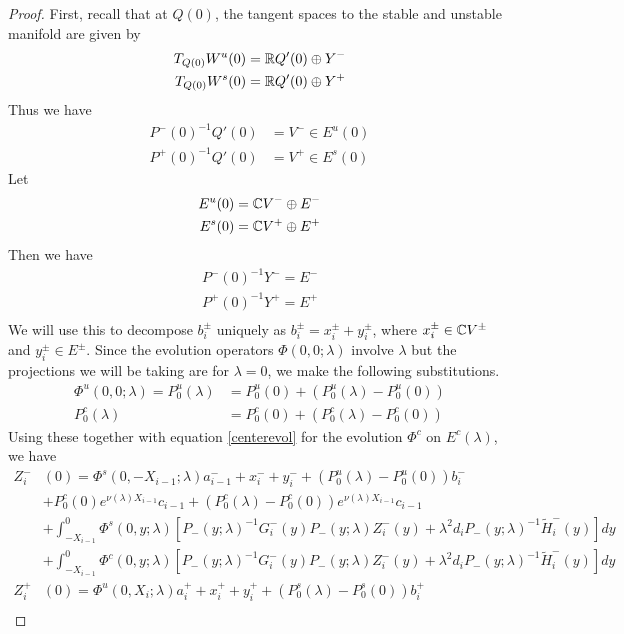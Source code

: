 \documentclass[thesis.tex]{subfiles}
\begin{document}
\begin{lemma}
\begin{proof}
First, recall that at $Q(0)$, the tangent spaces to the stable and unstable manifold are given by
\begin{align*}
T_{Q(0)} W^u(0) &= \mathbb{R} Q'(0) \oplus Y^- \\
T_{Q(0)} W^s(0) &= \mathbb{R} Q'(0) \oplus Y^+
\end{align*}
Thus we have
\begin{align*}
P^-(0)^{-1} Q'(0) &= V^- \in E^u(0) \\
P^+(0)^{-1} Q'(0) &= V^+ \in E^s(0)
\end{align*}
Let
\begin{align*}
E^u(0) &= \mathbb{C} V^- \oplus E^- \\
E^s(0) &= \mathbb{C} V^+ \oplus E^+ \\
\end{align*}
Then we have
\begin{align*}
P^-(0)^{-1} Y^- = E^- \\
P^+(0)^{-1} Y^+ = E^+ \\
\end{align*}
We will use this to decompose $b_i^\pm$ uniquely as $b_i^\pm = x_i^\pm + y_i^\pm$, where $x_i^\pm \in \mathbb{C} V^\pm$ and $y_i^\pm \in E^\pm$. Since the evolution operators $\Phi(0, 0; \lambda)$ involve $\lambda$ but the projections we will be taking are for $\lambda = 0$, we make the following substitutions.
\begin{align*}
\Phi^u(0, 0; \lambda) = P_0^u(\lambda) &= P_0^u(0) + (P_0^u(\lambda) - P_0^u(0)) \\
P_0^c(\lambda) &= P_0^c(0) + (P_0^c(\lambda) - P_0^c(0))
\end{align*}
Using these together with equation \eqref{centerevol} for the evolution $\Phi^c$ on $E^c(\lambda)$, we have
\begin{align*}
Z_i^-&(0) = \Phi^s(0, -X_{i-1}; \lambda) a_{i-1}^- + x_i^- + y_i^- + (P_0^u(\lambda) - P_0^u(0))b_i^- \\
&+ P_0^c(0) e^{\nu(\lambda) X_{i-1}} c_{i-1} + (P_0^c(\lambda) - P_0^c(0)) e^{\nu(\lambda) X_{i-1}} c_{i-1} \\
&+ \int_{-X_{i-1}}^0 \Phi^s(0, y; \lambda) [P_-(y; \lambda)^{-1} G_i^-(y) P_-(y; \lambda)Z_i^-(y) + \lambda^2 d_i P_-(y; \lambda)^{-1} \tilde{H}_i^-(y)] dy \\
&+ \int_{-X_{i-1}}^0 \Phi^c(0, y; \lambda) [P_-(y; \lambda)^{-1} G_i^-(y) P_-(y; \lambda)Z_i^-(y) + \lambda^2 d_i P_-(y; \lambda)^{-1} \tilde{H}_i^-(y)] dy  \\ 
Z_i^+&(0) = \Phi^u(0, X_i; \lambda) a_i^+ + x_i^+ + y_i^+ + (P_0^s(\lambda) - P_0^s(0)) b_i^+ \\

\end{align*}
\end{proof}
\end{lemma}
\end{document}
